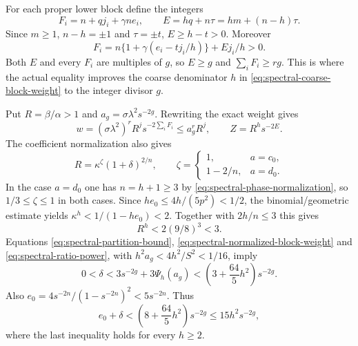 For each proper lower block define the integers
\begin{equation}\label{eq:spectral-integer-activities}
 F_i=n+qj_i+\gamma ne_i,
 \qquad E=hq+n\tau=hm+(n-h)\tau.
\end{equation}
Since $m\geqslant1$, $n-h=\pm1$ and $\tau=\pm t$,
$E\geqslant h-t>0$. Moreover
\begin{equation}\label{eq:spectral-activity-positive}
 F_i=n\{1+\gamma(e_i-tj_i/h)\}+Ej_i/h>0.
\end{equation}
Both $E$ and every $F_i$ are multiples of $g$, so $E\geqslant g$
and $\sum_iF_i\geqslant rg$. This is where the actual equality
improves the coarse denominator $h$ in
\eqref{eq:spectral-coarse-block-weight} to the integer divisor $g$.

Put $R=\beta/\alpha>1$ and $a_g=\sigma\lambda^2s^{-2g}$.
Rewriting the exact weight gives
\begin{equation}\label{eq:spectral-normalized-block-weight}
 w=(\sigma\lambda^2)^rR^j s^{-2\sum_iF_i}
 \leqslant a_g^rR^j,
 \qquad Z=R^h s^{-2E}.
\end{equation}
The coefficient normalization also gives
$$
 R=\kappa^{\zeta}(1+\delta)^{2/n},\qquad
 \zeta=\begin{cases}1,&a=c_0,\\1-2/n,&a=d_0.
 \end{cases}
$$
In the case $a=d_0$ one has $n=h+1\geqslant3$ by
\eqref{eq:spectral-phase-normalization}, so $1/3\leqslant\zeta\leqslant1$ in both
cases. Since
$he_0\leqslant4h/(5p^2)<1/2$, the binomial/geometric estimate yields
$\kappa^h<1/(1-he_0)<2$. Together with $2h/n\leqslant3$ this gives
\begin{equation}\label{eq:spectral-ratio-power}
 R^h<2(9/8)^3<3.
\end{equation}
Equations \eqref{eq:spectral-partition-bound},
\eqref{eq:spectral-normalized-block-weight} and
\eqref{eq:spectral-ratio-power}, with
$h^2a_g<4h^2/S^2<1/16$, imply
\begin{equation}\label{eq:spectral-refined-delta}
 0<\delta<3s^{-2g}+3\Psi_h(a_g)
 <\left(3+\frac{64}{5}h^2\right)s^{-2g}.
\end{equation}
Also $e_0=4s^{-2n}/(1-s^{-2n})^2<5s^{-2n}$. Thus
\begin{equation}\label{eq:spectral-total-coefficient-error}
 e_0+\delta<\left(8+\frac{64}{5}h^2\right)s^{-2g}
 \leqslant15h^2s^{-2g},
\end{equation}
where the last inequality holds for every $h\geqslant2$.

